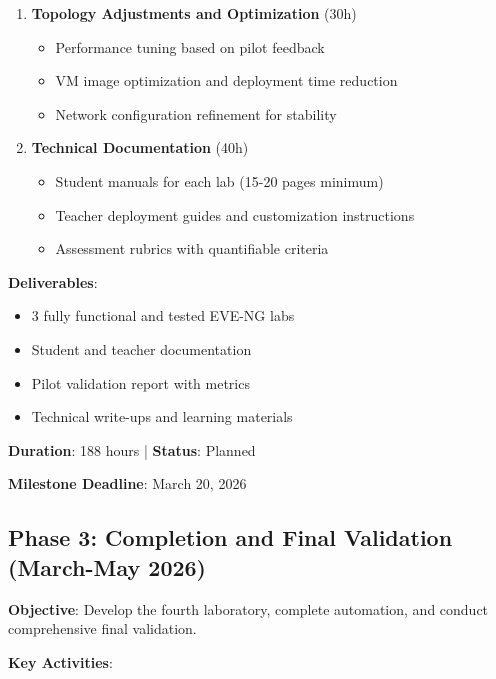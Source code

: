 \begin{enumerate}
\item \textbf{Topology Adjustments and Optimization} (30h)
\begin{itemize}
\item Performance tuning based on pilot feedback
\item VM image optimization and deployment time reduction
\item Network configuration refinement for stability
\end{itemize}

\item \textbf{Technical Documentation} (40h)
\begin{itemize}
\item Student manuals for each lab (15-20 pages minimum)
\item Teacher deployment guides and customization instructions
\item Assessment rubrics with quantifiable criteria
\end{itemize}

\end{enumerate}

\textbf{Deliverables}:
\begin{itemize}
\item 3 fully functional and tested EVE-NG labs
\item Student and teacher documentation
\item Pilot validation report with metrics
\item Technical write-ups and learning materials
\end{itemize}

\textbf{Duration}: 188 hours | \textbf{Status}: Planned

\textbf{Milestone Deadline}: March 20, 2026

\subsection{Phase 3: Completion and Final Validation (March-May 2026)}

\textbf{Objective}: Develop the fourth laboratory, complete automation, and conduct comprehensive final validation.

\textbf{Key Activities}:

